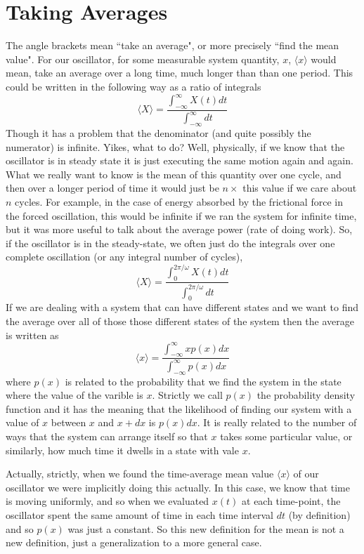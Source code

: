 \documentclass[]{revtex4}
\newcommand{\sm}[1]{{\[#1\]}}
\begin{document}
\section*{Taking Averages}
The angle brackets mean ``take an average", or more precisely ``find the mean value".  For our oscillator, for some measurable
system quantity, $x$,
$\langle x\rangle$ would mean, take an average over a long time, much longer than
than one period. This could be written in the following way as a ratio of integrals
\sm{\langle X\rangle = \frac{\int_{-\infty}^\infty X(t) dt}{\int_{-\infty}^\infty dt}}
Though it has a problem that the denominator (and quite possibly the numerator) is infinite.  Yikes, what to do?
Well, physically, if we know that the oscillator is in steady state it is just executing the same motion again
and again.  What we really want to know is the mean of this quantity over one cycle, and then over a longer period
of time it would just be $n\times$ this value if we care about $n$ cycles.   For example, in the case of energy absorbed
by the frictional force in the forced oscillation, this would be infinite if we ran the system for infinite time, but
it was more useful to talk about the average power (rate of doing work). So,
if the oscillator is in the steady-state, we often just do the integrals over one complete oscillation
(or any integral number of cycles),
\sm{\langle X\rangle = \frac{\int_{0}^{{2\pi/\omega}} X(t) dt}{\int_{0}^{2\pi/\omega} dt}}
If we are dealing with a system that can have different states and we want to find the average over all of
those those different states of the system then
the average is written as
\sm{\langle x\rangle=\frac{\int_{-\infty}^{\infty} xp(x)dx}{\int_{-\infty}^{\infty} p(x)dx}\label{avx}}
where $p(x)$ is related to the probability that we find the system in the state where the value of the
varible is $x$.  Strictly we call $p(x)$ the probability density function and it has the meaning that
the likelihood of finding our system with a value of $x$ between $x$ and $x+dx$ is $p(x)dx$.  It is
really related to the number of ways that the system can arrange itself so that $x$ takes some particular
value, or similarly, how much time it dwells in a state with vale $x$.

Actually, strictly, when we found the time-average mean value $\langle x\rangle$ of our oscillator we were implicitly doing this
actually.  In this case, we know that time is moving uniformly, and so when we evaluated $x(t)$ at each time-point,
the oscillator spent the same amount of time in each time interval $dt$ (by definition) and so $p(x)$ was just a
constant.  So this new definition for the mean is not a new definition, just a generalization to a more general case.
\end{document}
